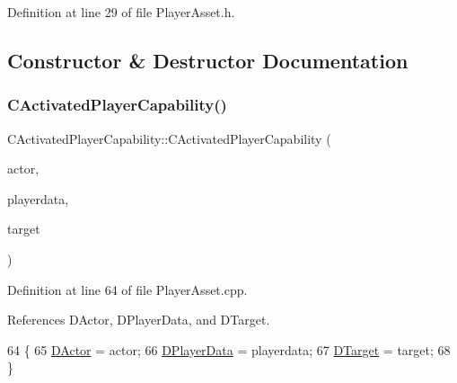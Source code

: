 Definition at line 29 of file Player\+Asset.\+h.



\subsection{Constructor \& Destructor Documentation}
\hypertarget{classCActivatedPlayerCapability_a1ece00ffb6a7b925c84dd94a7407a0d1}{}\label{classCActivatedPlayerCapability_a1ece00ffb6a7b925c84dd94a7407a0d1} 
\subsubsection{\texorpdfstring{C\+Activated\+Player\+Capability()}{CActivatedPlayerCapability()}}
{\footnotesize\ttfamily C\+Activated\+Player\+Capability\+::\+C\+Activated\+Player\+Capability (\begin{DoxyParamCaption}\item[{std\+::shared\+\_\+ptr$<$ \hyperlink{classCPlayerAsset}{C\+Player\+Asset} $>$}]{actor,  }\item[{std\+::shared\+\_\+ptr$<$ \hyperlink{classCPlayerData}{C\+Player\+Data} $>$}]{playerdata,  }\item[{std\+::shared\+\_\+ptr$<$ \hyperlink{classCPlayerAsset}{C\+Player\+Asset} $>$}]{target }\end{DoxyParamCaption})}



Definition at line 64 of file Player\+Asset.\+cpp.



References D\+Actor, D\+Player\+Data, and D\+Target.


\begin{DoxyCode}
64                                                                                                            
                                                                   \{
65     \hyperlink{classCActivatedPlayerCapability_a54ca944b47bff2718330639941d402b0}{DActor} = actor;
66     \hyperlink{classCActivatedPlayerCapability_a9bf27c322a73f4b11c8183cc1973c3d8}{DPlayerData} = playerdata;
67     \hyperlink{classCActivatedPlayerCapability_a8a1cf50b6501bcfd55af0c935828e395}{DTarget} = target;
68 \}
\end{DoxyCode}
\hypertarget{classCActivatedPlayerCapability_a75845fda9554fb75644aae5a6c5f0084}{}\label{classCActivatedPlayerCapability_a75845fda9554fb75644aae5a6c5f0084} 

